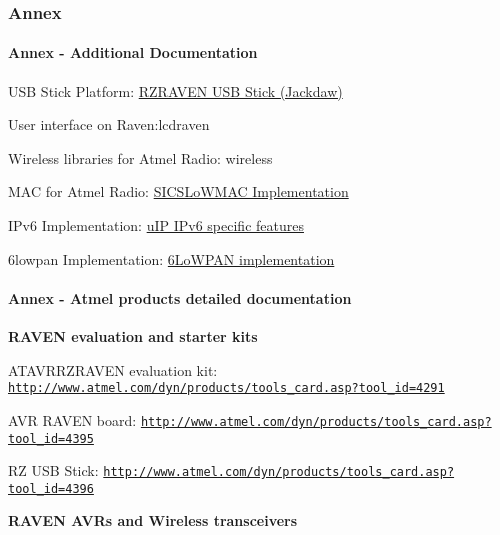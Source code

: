  \hypertarget{a00058_annex}{}\subsubsection{\-Annex}\label{a00058_annex}
\hypertarget{a00058_annex_contikiDocs}{}\paragraph{\-Annex -\/ Additional Documentation}\label{a00058_annex_contikiDocs}
\begin{DoxyItemize}
\item \-U\-S\-B \-Stick \-Platform\-: \hyperlink{a00053}{\-R\-Z\-R\-A\-V\-E\-N \-U\-S\-B \-Stick (\-Jackdaw)} \item \-User interface on \-Raven\-:lcdraven \item \-Wireless libraries for \-Atmel \-Radio\-: wireless \item \-M\-A\-C for \-Atmel \-Radio\-: \hyperlink{a00055}{\-S\-I\-C\-S\-Lo\-W\-M\-A\-C \-Implementation} \item \-I\-Pv6 \-Implementation\-: \hyperlink{a00061}{u\-I\-P \-I\-Pv6 specific features} \item 6lowpan \-Implementation\-: \hyperlink{a00056}{6\-Lo\-W\-P\-A\-N implementation}\end{DoxyItemize}
\hypertarget{a00058_annex_hardware}{}\paragraph{\-Annex -\/ Atmel products detailed documentation}\label{a00058_annex_hardware}
{\bfseries \-R\-A\-V\-E\-N evaluation and starter kits}\par
 \begin{DoxyItemize}
\item \-A\-T\-A\-V\-R\-R\-Z\-R\-A\-V\-E\-N evaluation kit\-: \href{http://www.atmel.com/dyn/products/tools_card.asp?tool_id=4291}{\tt http\-://www.\-atmel.\-com/dyn/products/tools\-\_\-card.\-asp?tool\-\_\-id=4291} \item \-A\-V\-R \-R\-A\-V\-E\-N board\-: \href{http://www.atmel.com/dyn/products/tools_card.asp?tool_id=4395}{\tt http\-://www.\-atmel.\-com/dyn/products/tools\-\_\-card.\-asp?tool\-\_\-id=4395} \item \-R\-Z \-U\-S\-B \-Stick\-: \href{http://www.atmel.com/dyn/products/tools_card.asp?tool_id=4396}{\tt http\-://www.\-atmel.\-com/dyn/products/tools\-\_\-card.\-asp?tool\-\_\-id=4396}\end{DoxyItemize}
{\bfseries \-R\-A\-V\-E\-N \-A\-V\-Rs and \-Wireless transceivers}\par
